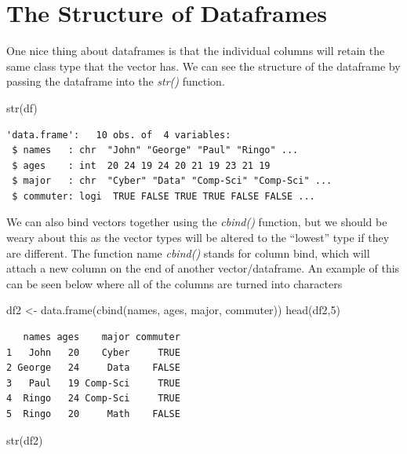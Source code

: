 \documentclass[
  letterpaper,
  DIV=11,
  numbers=noendperiod]{scrreprt}
\newenvironment{Shaded}{\begin{snugshade}}{\end{snugshade}}
\newcommand{\DecValTok}[1]{\textcolor[rgb]{0.68,0.00,0.00}{#1}}
\newcommand{\FunctionTok}[1]{\textcolor[rgb]{0.28,0.35,0.67}{#1}}
\newcommand{\NormalTok}[1]{\textcolor[rgb]{0.00,0.23,0.31}{#1}}
\newcommand{\OtherTok}[1]{\textcolor[rgb]{0.00,0.23,0.31}{#1}}
\begin{document}
\section{The Structure of Dataframes}\label{the-structure-of-dataframes}

One nice thing about dataframes is that the individual columns will
retain the same class type that the vector has. We can see the structure
of the dataframe by passing the dataframe into the \emph{str()}
function.

\begin{Shaded}
\begin{Highlighting}[]
\FunctionTok{str}\NormalTok{(df)}
\end{Highlighting}
\end{Shaded}

\begin{verbatim}
'data.frame':   10 obs. of  4 variables:
 $ names   : chr  "John" "George" "Paul" "Ringo" ...
 $ ages    : int  20 24 19 24 20 21 19 23 21 19
 $ major   : chr  "Cyber" "Data" "Comp-Sci" "Comp-Sci" ...
 $ commuter: logi  TRUE FALSE TRUE TRUE FALSE FALSE ...
\end{verbatim}

We can also bind vectors together using the \emph{cbind()} function, but
we should be weary about this as the vector types will be altered to the
``lowest'' type if they are different. The function name \emph{cbind()}
stands for column bind, which will attach a new column on the end of
another vector/dataframe. An example of this can be seen below where all
of the columns are turned into characters

\begin{Shaded}
\begin{Highlighting}[]
\NormalTok{df2 }\OtherTok{\textless{}{-}} \FunctionTok{data.frame}\NormalTok{(}\FunctionTok{cbind}\NormalTok{(names, ages, major, commuter))}
\FunctionTok{head}\NormalTok{(df2,}\DecValTok{5}\NormalTok{)}
\end{Highlighting}
\end{Shaded}

\begin{verbatim}
   names ages    major commuter
1   John   20    Cyber     TRUE
2 George   24     Data    FALSE
3   Paul   19 Comp-Sci     TRUE
4  Ringo   24 Comp-Sci     TRUE
5  Ringo   20     Math    FALSE
\end{verbatim}

\begin{Shaded}
\begin{Highlighting}[]
\FunctionTok{str}\NormalTok{(df2)}
\end{Highlighting}
\end{Shaded}
\end{document}
